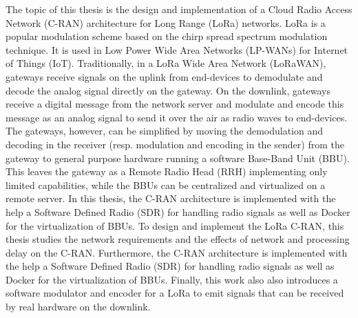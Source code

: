 The topic of this thesis is the design and implementation of a Cloud Radio Access Network (C-RAN) architecture for Long Range (LoRa) networks. 
LoRa is a popular modulation scheme based on the chirp spread spectrum modulation technique. 
It is used in Low Power Wide Area Networks (LP-WANs) for Internet of Things (IoT). 
Traditionally, in a LoRa Wide Area Network (LoRaWAN), gateways receive signals on the uplink from end-devices to demodulate and decode the analog signal directly on the gateway.
On the downlink, gateways receive a digital message from the network server and modulate and encode this message as an analog signal to send it over the air as radio waves to end-devices.
The gateways, however, can be simplified by moving the demodulation and decoding in the receiver (resp. modulation and encoding in the sender) from the gateway to general purpose hardware running a software Base-Band Unit (BBU). 
This leaves the gateway as a Remote Radio Head (RRH) implementing only limited capabilities, while the BBUs can be centralized and virtualized on a remote server.
In this thesis, the C-RAN architecture is implemented with the help a Software Defined Radio (SDR) for handling radio signals as well as Docker for the virtualization of BBUs. 
To design and implement the LoRa C-RAN, this thesis studies the network requirements and the effects of network and processing delay on the C-RAN. 
Furthermore, the C-RAN architecture is implemented with the help a Software Defined Radio (SDR) for handling radio signals as well as Docker for the virtualization of BBUs. 
Finally, this work also also introduces a software modulator and encoder for a LoRa to emit signals that can be received by real hardware on the downlink. 
